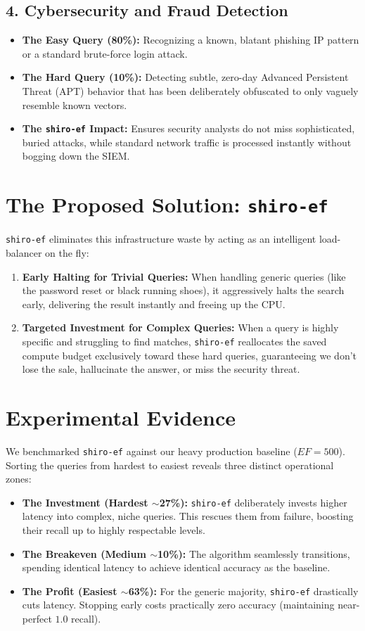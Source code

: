 \documentclass[11pt, a4paper]{article}
\begin{document}
\subsection{4. Cybersecurity and Fraud Detection}
\begin{itemize}
    \item \textbf{The Easy Query (80\%):} Recognizing a known, blatant phishing IP pattern or a standard brute-force login attack.
    \item \textbf{The Hard Query (10\%):} Detecting subtle, zero-day Advanced Persistent Threat (APT) behavior that has been deliberately obfuscated to only vaguely resemble known vectors.
    \item \textbf{The \texttt{shiro-ef} Impact:} Ensures security analysts do not miss sophisticated, buried attacks, while standard network traffic is processed instantly without bogging down the SIEM.
\end{itemize}

\section{The Proposed Solution: \texttt{shiro-ef}}
\texttt{shiro-ef} eliminates this infrastructure waste by acting as an intelligent load-balancer on the fly:
\begin{enumerate}
    \item \textbf{Early Halting for Trivial Queries:} When handling generic queries (like the password reset or black running shoes), it aggressively halts the search early, delivering the result instantly and freeing up the CPU.
    \item \textbf{Targeted Investment for Complex Queries:} When a query is highly specific and struggling to find matches, \texttt{shiro-ef} reallocates the saved compute budget exclusively toward these hard queries, guaranteeing we don't lose the sale, hallucinate the answer, or miss the security threat.
\end{enumerate}

\section{Experimental Evidence}
We benchmarked \texttt{shiro-ef} against our heavy production baseline ($EF=500$). Sorting the queries from hardest to easiest reveals three distinct operational zones:
\begin{itemize}
    \item \textbf{The Investment (Hardest $\sim$27\%):} \texttt{shiro-ef} deliberately invests higher latency into complex, niche queries. This rescues them from failure, boosting their recall up to highly respectable levels.
    \item \textbf{The Breakeven (Medium $\sim$10\%):} The algorithm seamlessly transitions, spending identical latency to achieve identical accuracy as the baseline.
    \item \textbf{The Profit (Easiest $\sim$63\%):} For the generic majority, \texttt{shiro-ef} drastically cuts latency. Stopping early costs practically zero accuracy (maintaining near-perfect $1.0$ recall).
\end{itemize}
\end{document}
